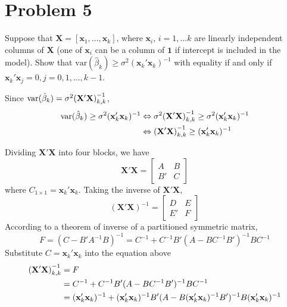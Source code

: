 \documentclass[10pt]{report}
\DeclarePairedDelimiter\autoparen{(}{)}
\newcommand{\pa}[1]{\autoparen*{#1}}
\newcommand{\var} {\text{var}}
\newcommand{\m}[1] {\mathbf{#1}}
\begin{document}
\section*{Problem 5}
Suppose that $\m{X}= [\m{x}_1, \dots, \m{x}_k]$, where $\m{x}_i$, $i=1, \dots k$ are linearly independent columns of $\m{X}$ (one of $\m{x}_i$ can be a column of $\m{1}$ if intercept is included in the model). Show that $\var(\hat{\beta}_k) \ge \sigma^2(\m{x}_k' \m{x}_k)^{-1}$ with equality if and only if $\m{x}_k' \m{x}_j = 0, j=0,1,\dots,k-1$.

Since $\var(\hat{\beta}_k) = \sigma^2 \pa{\m{X}' \m{X}}^{-1}_{k,k}$, 
\begin{align*}
\var(\hat{\beta}_k) \ge \sigma^2(\m{x}_k' \m{x}_k)^{-1} 
&\Leftrightarrow 
\sigma^2 \pa{\m{X}' \m{X}}^{-1}_{k,k} \ge \sigma^2(\m{x}_k' \m{x}_k)^{-1}\\
&\Leftrightarrow 
\pa{\m{X}' \m{X}}^{-1}_{k,k} \ge (\m{x}_k' \m{x}_k)^{-1}
\end{align*}

Dividing $\m{X}' \m{X}$ into four blocks, we have
\[
\m{X}' \m{X} =
	\left[
	\begin{array}{c|c}
	A & B \\ \hline
	B' & C
	\end{array}
	\right]
\]
where $C_{1\times1} = \m{x}_k' \m{x}_k$. Taking the inverse of $\m{X}' \m{X}$,
\[
(\m{X}' \m{X})^{-1} = 
	\left[
	\begin{array}{c|c}
	D & E \\ \hline
	E' & F
	\end{array}
	\right]
\]
According to a theorem of inverse of a partitioned symmetric matrix, 
\[
F = (C - B'A^{-1}B)^{-1} = C^{-1} + C^{-1}B'(A-BC^{-1}B')^{-1} BC^{-1}
\]
Substitute $C= \m{x}_k' \m{x}_k$ into the equation above
\begin{align*}
	\pa{\m{X}' \m{X}}^{-1}_{k,k} 
	&= F\\
	&= C^{-1} + C^{-1}B'(A-BC^{-1}B')^{-1} BC^{-1}\\
	&= (\m{x}_k' \m{x}_k)^{-1} + (\m{x}_k' \m{x}_k)^{-1} B'(A-B(\m{x}_k' \m{x}_k)^{-1}B')^{-1} B(\m{x}_k' \m{x}_k)^{-1}
\end{align*}
\end{document}
